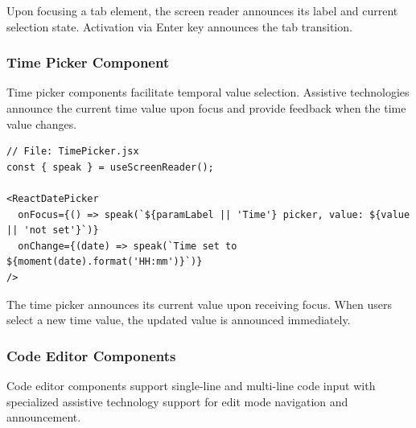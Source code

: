 Upon focusing a tab element, the screen reader announces its label and current selection state. Activation via Enter key announces the tab transition.

\subsubsection{Time Picker Component}

Time picker components facilitate temporal value selection. Assistive technologies announce the current time value upon focus and provide feedback when the time value changes.

\begin{lstlisting}[caption={Time picker with value announcements}, label={lst:timepicker-sr}]
// File: TimePicker.jsx
const { speak } = useScreenReader();

<ReactDatePicker
  onFocus={() => speak(`${paramLabel || 'Time'} picker, value: ${value || 'not set'}`)}
  onChange={(date) => speak(`Time set to ${moment(date).format('HH:mm')}`)}
/>
\end{lstlisting}

The time picker announces its current value upon receiving focus. When users select a new time value, the updated value is announced immediately.

\subsubsection{Code Editor Components}

Code editor components support single-line and multi-line code input with specialized assistive technology support for edit mode navigation and announcement.

